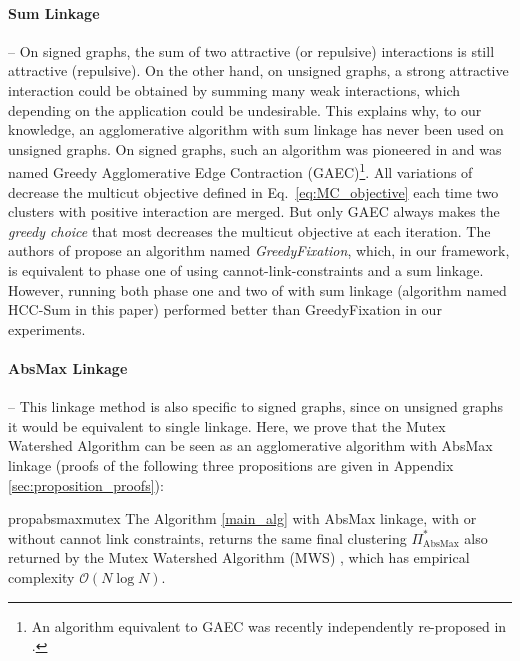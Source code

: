\paragraph{Sum Linkage} -- 
On signed graphs, the sum of two attractive (or repulsive) interactions is still attractive (repulsive). On the other hand, on unsigned graphs, a strong attractive interaction could be obtained by summing many weak interactions, which depending on the application could be undesirable. This explains why, to our knowledge, an agglomerative algorithm with sum linkage has never been used on unsigned graphs. On signed graphs, such an algorithm was pioneered in \cite{levinkov2017comparative,keuper2015efficient} and was named Greedy Agglomerative Edge Contraction (GAEC)\footnote{An algorithm equivalent to GAEC was recently independently re-proposed in \cite{chehreghani2020hierarchical}.}. All variations of \algname{} decrease the multicut objective defined in Eq.~\ref{eq:MC_objective} each time two clusters with positive interaction are merged. But only GAEC always makes the \emph{greedy choice} that most decreases the multicut objective at each iteration. The authors of \cite{levinkov2017comparative} propose an algorithm named \emph{GreedyFixation}, which, in our framework, is equivalent to phase one of \algname{} using cannot-link-constraints and a sum linkage. However, running both phase one and two of \algname{} with sum linkage (algorithm named HCC-Sum in this paper) performed better than GreedyFixation in our experiments.

\paragraph{AbsMax Linkage} -- This linkage method is also specific to signed graphs, since on unsigned graphs it would be equivalent to single linkage. Here, we prove that the Mutex Watershed Algorithm \cite{wolf2018mutex} can be seen as an agglomerative algorithm with AbsMax linkage (proofs of the following three propositions are given in Appendix \ref{sec:proposition_proofs}):
\begin{restatable}{prop}{absmaxmutex}
\label{prop:absmax_mutex}
The \algname{} Algorithm \ref{main_alg} with AbsMax linkage, with or without cannot link constraints, returns the same final clustering $\Pi^*_{\mathrm{AbsMax}}$ also returned by the Mutex Watershed Algorithm (MWS) \cite{wolf2018mutex}, which has empirical complexity $\mathcal{O}(N \log N)$.
\end{restatable}


